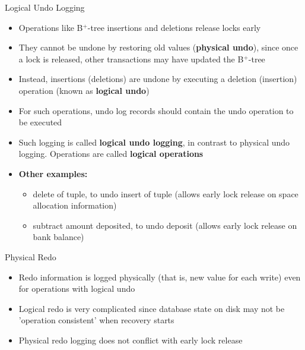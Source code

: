 \documentclass[aspectratio=169, xcolor=dvipsnames]{beamer}
\begin{document}
\begin{frame}{Logical Undo Logging}
    \begin{itemize}[<+->]
        \item Operations like B$^+$-tree insertions and deletions release locks early
        \item They cannot be undone by restoring old values (\textbf{physical undo}), since once a lock is released, other transactions may have updated the B$^+$-tree
        \item Instead, insertions (deletions) are undone by executing a deletion (insertion) operation (known as \textbf{logical undo})
        \item For such operations, undo log records should contain the undo operation to be executed
        \item Such logging is called \textbf{logical undo logging}, in contrast to physical undo logging. Operations are called \textbf{logical operations}
        \item \textbf{Other examples:}
        \begin{itemize}
            \item[$\triangleright$] delete of tuple, to undo insert of tuple (allows early lock release on space allocation information)
            \item[$\triangleright$] subtract amount deposited, to undo deposit (allows early lock release on bank balance)
        \end{itemize}
    \end{itemize}
\end{frame}

\begin{frame}{Physical Redo}
    \begin{itemize}[<+->]
        \item Redo information is logged physically (that is, new value for each write) even for operations with logical undo
        \item Logical redo is very complicated since database state on disk may not be 'operation consistent' when recovery starts
        \item Physical redo logging does not conflict with early lock release
    \end{itemize}
\end{frame}
\end{document}
